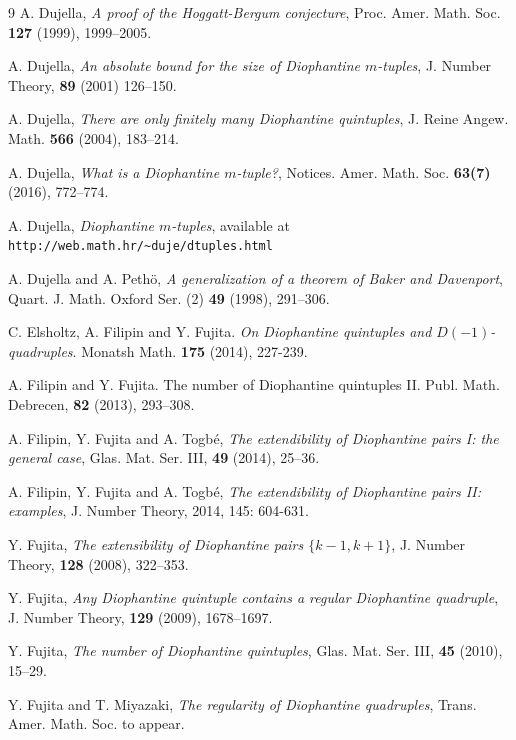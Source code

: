 \documentclass{amsart}
\theoremstyle{definition}
\begin{document}
\begin{thebibliography}{9}
 A. Dujella, \emph{A proof of the Hoggatt-Bergum conjecture}, Proc. Amer. Math. Soc. \textbf{127} (1999), 1999--2005.

 A. Dujella, \emph{An absolute bound for the size of Diophantine $m$-tuples}, J. Number Theory, {\bf 89} (2001) 126--150.

 A. Dujella, \emph{There are only finitely many Diophantine quintuples}, J. Reine Angew. Math. \textbf{566} (2004), 183--214.

 A. Dujella, \emph{What is a Diophantine $m$-tuple?}, Notices. Amer. Math. Soc. {\bf 63(7)} (2016), 772--774.

 A. Dujella, \emph{Diophantine $m$-tuples}, available at \texttt{http://web.math.hr/\textasciitilde duje/dtuples.html}

 A. Dujella and A. Peth\"{o}, \emph{A generalization of a theorem of Baker and Davenport}, Quart. J. Math. Oxford Ser. (2) \textbf{49} (1998), 291--306.

 C. Elsholtz, A. Filipin and Y. Fujita. \emph{On Diophantine quintuples and $D(-1)$-quadruples}. Monatsh Math. \textbf{175} (2014), 227-239.

  A. Filipin and Y. Fujita. The number of Diophantine quintuples II. Publ. Math. Debrecen, \textbf{82} (2013), 293--308.

 A. Filipin, Y. Fujita and A. Togb\'e, \emph{The extendibility of Diophantine pairs I: the general case}, Glas. Mat. Ser. III, \textbf{49} (2014), 25--36.

 A. Filipin, Y. Fujita and A. Togb\'e, \emph{The extendibility of Diophantine pairs II: examples}, J. Number Theory, 2014, 145: 604-631.

 Y. Fujita, \emph{The extensibility of Diophantine pairs $\{k-1, k+1\}$}, J. Number Theory, \textbf{128} (2008), 322--353.

 Y. Fujita, \emph{Any Diophantine quintuple contains a regular Diophantine quadruple}, J. Number Theory, \textbf{129} (2009), 1678--1697.

 Y. Fujita, \textit{The number of Diophantine quintuples}, Glas. Mat. Ser. III, \textbf{45} (2010), 15--29.

 Y. Fujita and T. Miyazaki, \textit{The regularity of Diophantine quadruples}, Trans. Amer. Math. Soc. to appear.


\end{thebibliography}
\end{document}
